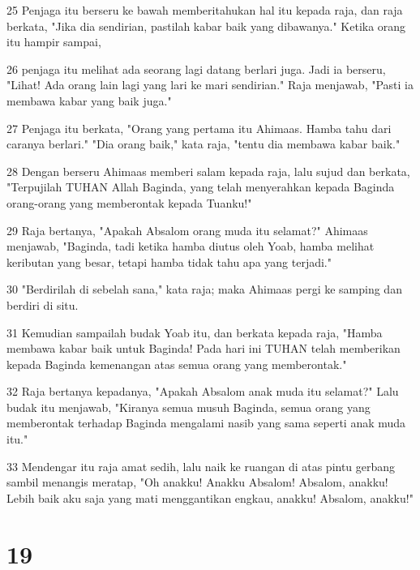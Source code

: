 \par 25 Penjaga itu berseru ke bawah memberitahukan hal itu kepada raja, dan raja berkata, "Jika dia sendirian, pastilah kabar baik yang dibawanya." Ketika orang itu hampir sampai,
\par 26 penjaga itu melihat ada seorang lagi datang berlari juga. Jadi ia berseru, "Lihat! Ada orang lain lagi yang lari ke mari sendirian." Raja menjawab, "Pasti ia membawa kabar yang baik juga."
\par 27 Penjaga itu berkata, "Orang yang pertama itu Ahimaas. Hamba tahu dari caranya berlari." "Dia orang baik," kata raja, "tentu dia membawa kabar baik."
\par 28 Dengan berseru Ahimaas memberi salam kepada raja, lalu sujud dan berkata, "Terpujilah TUHAN Allah Baginda, yang telah menyerahkan kepada Baginda orang-orang yang memberontak kepada Tuanku!"
\par 29 Raja bertanya, "Apakah Absalom orang muda itu selamat?" Ahimaas menjawab, "Baginda, tadi ketika hamba diutus oleh Yoab, hamba melihat keributan yang besar, tetapi hamba tidak tahu apa yang terjadi."
\par 30 "Berdirilah di sebelah sana," kata raja; maka Ahimaas pergi ke samping dan berdiri di situ.
\par 31 Kemudian sampailah budak Yoab itu, dan berkata kepada raja, "Hamba membawa kabar baik untuk Baginda! Pada hari ini TUHAN telah memberikan kepada Baginda kemenangan atas semua orang yang memberontak."
\par 32 Raja bertanya kepadanya, "Apakah Absalom anak muda itu selamat?" Lalu budak itu menjawab, "Kiranya semua musuh Baginda, semua orang yang memberontak terhadap Baginda mengalami nasib yang sama seperti anak muda itu."
\par 33 Mendengar itu raja amat sedih, lalu naik ke ruangan di atas pintu gerbang sambil menangis meratap, "Oh anakku! Anakku Absalom! Absalom, anakku! Lebih baik aku saja yang mati menggantikan engkau, anakku! Absalom, anakku!"

\chapter{19}

